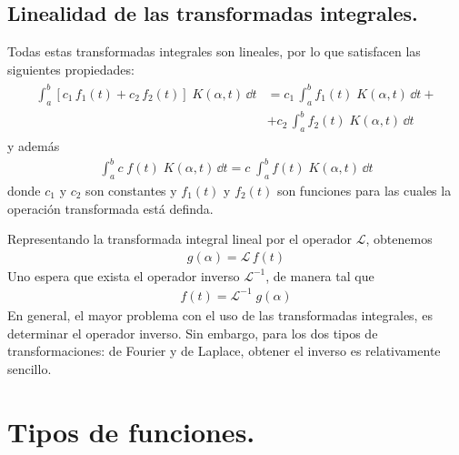 \subsection{Linealidad de las transformadas integrales.}
Todas estas transformadas integrales son lineales, por lo que satisfacen las siguientes propiedades:
\begin{align}
\begin{aligned}
\int_{a}^{b} [ c_{1} \, f_{1} (t) + c_{2} \, f_{2}(t)] \; K(\alpha, t) \, \dd{t} &= c_{1} \, \int_{a}^{b} f_{1} (t) \; K(\alpha, t) \, \dd{t} + \\
&+ c_{2} \, \int_{a}^{b} f_{2} (t) \; K(\alpha, t) \, \dd{t}
\end{aligned}
\label{eq:ecuacion_15_08} 
\end{align}
y además
\begin{align}
\int_{a}^{b}  c \; f (t) \; K(\alpha, t) \, \dd t =  c \; \int_{a}^{b} f (t) \; K(\alpha, t) \, \dd{t}
\label{eq:ecuacion_15_09}
\end{align}
donde $c_{1}$ y $c_{2}$ son constantes y $f_{1}(t)$ y $f_{2}(t)$ son funciones para las cuales la operación transformada está definda.
\par
Representando la transformada integral lineal por el operador $\mathcal{L}$, obtenemos
\begin{align}
g (\alpha) = \mathcal{L} \, f(t)
\label{eq:ecuacion_15_10}
\end{align}
Uno espera que exista el operador inverso $\mathcal{L}^{-1}$, de manera tal que
\begin{align}
f(t) = \mathcal{L}^{-1}  \; g (\alpha)
\label{eq:ecuacion_15_11}
\end{align}
En general, el mayor problema con el uso de las transformadas integrales, es determinar el operador inverso. Sin embargo, para los dos tipos de transformaciones: de Fourier y de Laplace, obtener el inverso es relativamente sencillo.

\section{Tipos de funciones.}

